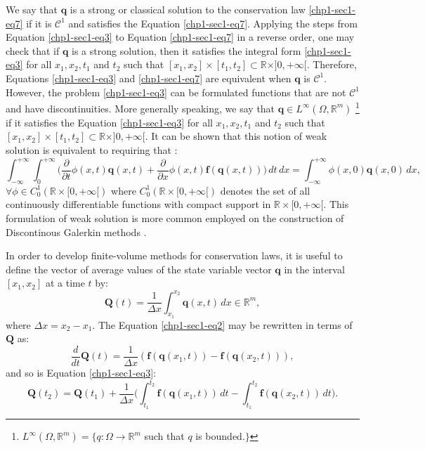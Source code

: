 We say that $\mathbf{q}$ is a strong or classical solution to the conservation law \eqref{chp1-sec1-eq7}
if it is $\mathcal{C}^1$ and satisfies the Equation \eqref{chp1-sec1-eq7}.
Applying the steps from Equation \eqref{chp1-sec1-eq3} to Equation \eqref{chp1-sec1-eq7}
in a reverse order, one may check that if $\mathbf{q}$ is a strong solution,
then it satisfies the integral form \eqref{chp1-sec1-eq3} for all $x_1, x_2, t_1$ and $t_2$ such that
$[x_1, x_2] \times [t_1, t_2] \subset \mathbb{R}\times ]0, +\infty[$. 
Therefore, Equations \eqref{chp1-sec1-eq3} and \eqref{chp1-sec1-eq7} are
equivalent when $\mathbf{q}$ is $\mathcal{C}^1$.
However, the problem \eqref{chp1-sec1-eq3} can be formulated
functions that are not $\mathcal{C}^1$ and have discontinuities.
More generally speaking, we say that $\mathbf{q} \in L^{\infty}(\Omega, \mathbb{R}^m)$ 
\footnote{$L^{\infty}(\Omega, \mathbb{R}^m) = \{q: \Omega \to \mathbb{R}^m$
such that $q$ is bounded.$\}$}
if it satisfies the Equation 
\eqref{chp1-sec1-eq3} for all $x_1, x_2, t_1$ and $t_2$ such that
$[x_1, x_2] \times [t_1, t_2] \subset \mathbb{R}\times ]0, +\infty[$.
It can be shown that this notion of weak solution is equivalent to requiring that \citep{leveque:1990}:
\begin{equation}
	\label{chp1-sec1-eq8}
	\int_{-\infty}^{+\infty} \int_{0}^{+\infty} \bigg(
	\frac{\partial}{\partial t} \phi(x, t)\mathbf{q}(x, t) +
	\frac{\partial}{\partial x} \phi(x ,t)\mathbf{f}(\mathbf{q}(x, t)) 
	\bigg)\,dt \,dx = 
	\int_{-\infty}^{+\infty} \phi(x, 0)\mathbf{q}(x, 0) \,dx  , \quad
\end{equation}
$\forall \phi \in C_{0}^{1}(\mathbb{R}\times[0, +\infty[)$
where $C_{0}^{1}(\mathbb{R}\times[0, +\infty[)$ denotes the set
of all continuously differentiable functions with compact support 
in $\mathbb{R}\times[0, +\infty[$. This formulation of weak solution
is more common employed on the construction of Discontinous Galerkin
methods \citep{nair:2011}.

In order to develop finite-volume methods for conservation laws, it is useful to define the vector of
average values of the state variable vector $\mathbf{q}$ in the interval $[x_1, x_2]$ at a time $t$ by:
\begin{equation}
	\label{chp1-sec1-eq9}
	\mathbf{Q}(t) = \frac{1}{\Delta x}
	\int_{x_1}^{x_2} \mathbf{q}(x,t) \,dx
	\in \mathbb{R}^m,
\end{equation}
where $\Delta x = x_2 - x_1$. The Equation \eqref{chp1-sec1-eq2} may be  rewritten in terms of $\mathbf{Q}$ as:
\begin{equation}
        \label{chp1-sec1-eq10}
	\frac{d}{dt} \mathbf{Q}(t) = \frac{1}{\Delta x} 
	(\mathbf{f}(\mathbf{q}(x_1,t)) - \mathbf{f}(\mathbf{q}(x_2,t))) ,
\end{equation}
and so is Equation \eqref{chp1-sec1-eq3}:
\begin{equation}
        \label{chp1-sec1-eq11}
	\mathbf{Q}(t_2) =  \mathbf{Q}(t_1) + 
	\frac{1}{\Delta x}\bigg( \int_{t_1}^{t_2} 
	\mathbf{f}(\mathbf{q}(x_1, t)) \,dt - 
	\int_{t_1}^{t_2}\mathbf{f}(\mathbf{q}(x_2, t)) \,dt \bigg).
\end{equation}

